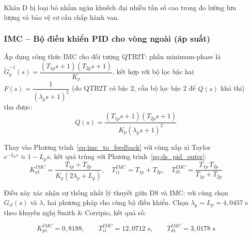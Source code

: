\documentclass[../main.tex]{subfiles}
\begin{document}
Khâu D bị loại bỏ nhằm ngăn khuếch đại nhiễu tần số cao trong đo lường lưu lượng và bảo vệ cơ cấu chấp hành van.

\subsubsection{IMC -- Bộ điều khiển PID cho vòng ngoài (áp suất)}

Áp dụng công thức IMC cho đối tượng QTB2T: phần minimum-phase là $\tilde{G}_p^{-1}(s) = \dfrac{(T_{1p} s + 1)(T_{2p} s + 1)}{K_p}$, kết hợp với bộ lọc bậc hai $F(s) = \dfrac{1}{(\lambda_p s + 1)^2}$ (do QTB2T có bậc 2, cần bộ lọc bậc 2 để $Q(s)$ khả thi) thu được:
\begin{equation}
    Q(s) = \frac{(T_{1p} s + 1)(T_{2p} s + 1)}{K_p (\lambda_p s + 1)^2}
    \label{eq:imc_Q_outer}
\end{equation}

Thay vào Phương trình~\ref{eq:imc_to_feedback} với cùng xấp xỉ Taylor $e^{-L_p s} \approx 1 - L_p s$, kết quả trùng với Phương trình~\ref{eq:ds_pid_outer}:
\begin{equation}
    K_{p1}^{IMC} = \frac{T_{1p}+T_{2p}}{K_p(2\lambda_p+L_p)}, \quad T_{i1}^{IMC} = T_{1p}+T_{2p}, \quad T_{d1}^{IMC} = \frac{T_{1p}\,T_{2p}}{T_{1p}+T_{2p}}
    \label{eq:imc_pid_params_outer}
\end{equation}

Điều này xác nhận sự thống nhất lý thuyết giữa DS và IMC: với cùng chọn $G_{cl}(s)$ và $\lambda$, hai phương pháp cho cùng bộ điều khiển. Chọn $\lambda_p = L_p = 4{,}0457$ s theo khuyến nghị Smith \& Corripio, kết quả số:

\[
K_{p1}^{IMC} = 0{,}8188, \qquad T_{i1}^{IMC} = 12{,}0712 \text{ s}, \qquad T_{d1}^{IMC} = 3{,}0178 \text{ s}
\]

\begin{table}[H]
\centering
\caption{Thông số bộ điều khiển PID vòng ngoài (phương pháp IMC)}
\label{tab:tham_so_pid_vong_ngoai_imc}
\end{table}
\end{document}
